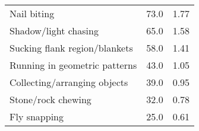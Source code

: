 \documentclass[varwidth=\maxdimen]{standalone}
\newcommand{\subrow}[1]{\hspace{1.25em}#1}
\begin{document}
\begin{tabular}[t]{lrr}
  \subrow{Nail biting}                         &       73.0 &            1.77 \\
  \subrow{Shadow/light chasing}                &       65.0 &            1.58 \\
  \subrow{Sucking flank region/blankets}       &       58.0 &            1.41 \\
  \subrow{Running in geometric patterns}       &       43.0 &            1.05 \\
  \subrow{Collecting/arranging objects}        &       39.0 &            0.95 \\
  \subrow{Stone/rock chewing}                  &       32.0 &            0.78 \\
  \subrow{Fly snapping}                        &       25.0 &            0.61 \\
\bottomrule
\end{tabular}
\end{document}
